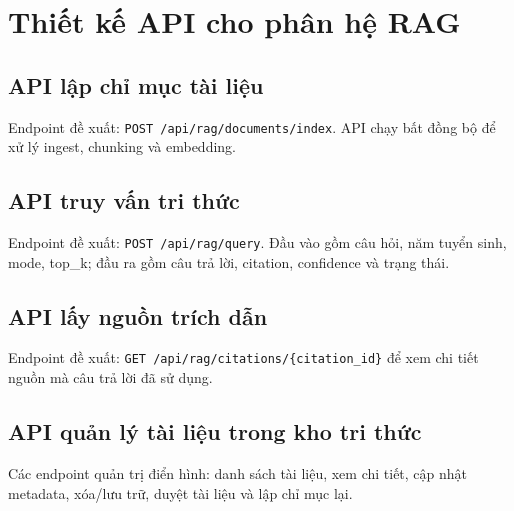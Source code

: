 ﻿\section{Thiết kế API cho phân hệ RAG}

\subsection{API lập chỉ mục tài liệu}

Endpoint đề xuất: \texttt{POST /api/rag/documents/index}. API chạy bất đồng bộ để xử lý ingest, chunking và embedding.

\subsection{API truy vấn tri thức}

Endpoint đề xuất: \texttt{POST /api/rag/query}. Đầu vào gồm câu hỏi, năm tuyển sinh, mode, top\_k; đầu ra gồm câu trả lời, citation, confidence và trạng thái.

\subsection{API lấy nguồn trích dẫn}

Endpoint đề xuất: \texttt{GET /api/rag/citations/\{citation\_id\}} để xem chi tiết nguồn mà câu trả lời đã sử dụng.

\subsection{API quản lý tài liệu trong kho tri thức}

Các endpoint quản trị điển hình: danh sách tài liệu, xem chi tiết, cập nhật metadata, xóa/lưu trữ, duyệt tài liệu và lập chỉ mục lại.
